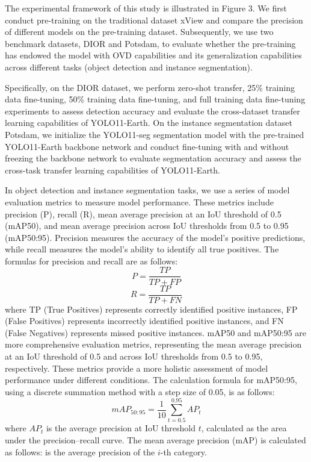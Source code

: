 \documentclass{article}
\begin{document}
The experimental framework of this study is illustrated in Figure 3. We first  
conduct pre-training on the traditional dataset xView and compare the precision  
of different models on the pre-training dataset. Subsequently, we use two  
benchmark datasets, DIOR and Potsdam, to evaluate whether the pre-training has  
endowed the model with OVD capabilities and its generalization capabilities  
across different tasks (object detection and instance segmentation).  

Specifically, on the DIOR dataset, we perform zero-shot transfer, 25\% training  
data fine-tuning, 50\% training data fine-tuning, and full training data  
fine-tuning experiments to assess detection accuracy and evaluate the  
cross-dataset transfer learning capabilities of YOLO11-Earth. On the instance  
segmentation dataset Potsdam, we initialize the YOLO11-seg segmentation model  
with the pre-trained YOLO11-Earth backbone network and conduct fine-tuning  
with and without freezing the backbone network to evaluate segmentation  
accuracy and assess the cross-task transfer learning capabilities of  
YOLO11-Earth.  

In object detection and instance segmentation tasks, we use a series of model  
evaluation metrics to measure model performance. These metrics include  
precision (P), recall (R), mean average precision at an IoU threshold of 0.5  
(mAP50), and mean average precision across IoU thresholds from 0.5 to 0.95  
(mAP50:95). Precision measures the accuracy of the model’s positive  
predictions, while recall measures the model’s ability to identify all true  
positives. The formulas for precision and recall are as follows:
\begin{equation}
    P= \frac{TP}{TP+FP}
\end{equation}
\begin{equation}
    R= \frac{TP}{TP+FN}
\end{equation}
where TP (True Positives) represents correctly identified positive instances, 
FP (False Positives) represents incorrectly identified positive instances, 
and FN (False Negatives) represents missed positive instances. 
mAP50 and mAP50:95 are more comprehensive evaluation metrics, 
representing the mean average precision at an IoU threshold of 0.5 
and across IoU thresholds from 0.5 to 0.95, respectively. 
These metrics provide a more holistic assessment of model performance 
under different conditions. 
The calculation formula for mAP50:95, using a discrete summation method 
with a step size of 0.05, is as follows:
\begin{equation}
    mAP_{50:95}= \frac{1}{10}\sum _{t=0.5}^{0.95}AP_{t}
\end{equation}
where $AP_{t}$ is the average precision at IoU threshold $t$, 
calculated as the area under the precision–recall curve.
The mean average precision (mAP) is calculated as follows:
is the average precision of the $i$-th category.
\end{document}
